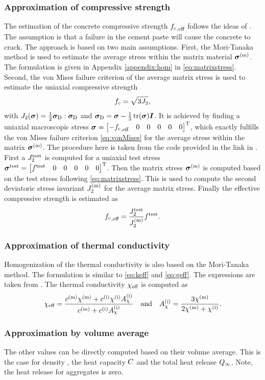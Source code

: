 \subsubsection{Approximation of compressive strength}
The estimation of the concrete compressive strength ${f_{\text{c}}}_{,\text{eff}}$ follows the ideas of \cite{nev_2018_mcam}.
The assumption is that a failure in the cement paste will cause the concrete to crack.
The approach is based on two main assumptions.
First, the Mori-Tanaka method is used to estimate the average stress within the matrix material $\boldsymbol{\sigma}^{(\text{m})}$. 
The formulation is given in Appendix \ref{appendix:hom} in \eqref{eq:matrixstress}.
Second, the von Mises failure criterion of the average matrix stress is used to estimate the uniaxial compressive strength
\begin{align}
{f_{\text{c}}} = \sqrt{3 J_2},  \label{eq:vonMises}
\end{align}
with $J_2(\boldsymbol{\sigma}) = \frac{1}{2} \boldsymbol{\sigma}_{\text{D}}:\boldsymbol{\sigma}_{\text{D}}$ and $\boldsymbol{\sigma}_{\text{D}} = \boldsymbol{\sigma} - \frac{1}{3}\operatorname{tr}(\boldsymbol{\sigma})\boldsymbol{I}$.
It is achieved by finding a uniaxial macroscopic stress $\boldsymbol{\sigma} = \begin{bmatrix} -{f_{\text{c}}}_{,\text{eff}} & 0 & 0 &0&0&0 \end{bmatrix}^\text{T}$, which exactly fulfills the von Mises failure criterion \eqref{eq:vonMises} for the average stress within the matrix $\boldsymbol{\sigma}^{(\text{m})}$.
The procedure here is taken from the code provided in the link in \cite{nee_2012_ammf}.
First a $J_2^{\text{test}}$ is computed for a uniaxial test stress $\boldsymbol{\sigma}^{\text{test}} = \begin{bmatrix} f^{\text{test}} & 0 & 0 &0&0&0 \end{bmatrix}^\text{T}$. 
Then the matrix stress $\boldsymbol{\sigma}^{(\text{m})}$ is computed based on the test stress following \eqref{eq:matrixstress}. 
This is used to compute the second deviatoric stress invariant $J_2^{(\text{m})}$ for the average matrix stress.
Finally the effective compressive strength is estimated as
\begin{align}
	{f_{\text{c}}}_{,\text{eff}} = \frac{J_2^{\text{test}}}{J_2^{(\text{m})}} f^{\text{test}}.
\end{align}
\subsubsection{Approximation of thermal conductivity }
Homogenization of the thermal conductivity is also based on the Mori-Tanaka method.
The formulation is similar to \eqref{eq:keff} and \eqref{eq:geff}.
The expressions are taken from \cite{str_2011_mbeo}.
The thermal conductivity $\chi_{\text{eff}}$ is computed as
\begin{align}
	\chi_{\text{eff}} = \dfrac{c^{(\text{m})}\chi^{(\text{m})} + c^{(\text{i})} \chi^{(\text{i})} A_{\chi}^{(\text{i})}}{c^{(\text{m})} +  c^{(\text{i})} A_{\chi}^{(\text{i})}}\quad\text{and}\quad
	A_{\chi}^{(\text{i})} = \frac{3\chi^{(\text{m})}}{2\chi^{(\text{m})}+\chi^{(\text{i})}}.
\end{align}
\subsubsection{Approximation by volume average}
The other values can be directly computed based on their volume average.
This is the case for density \density, the heat capacity $C$ and the total heat release $Q_{\infty}$.
Note, the heat release for aggregates is zero.

